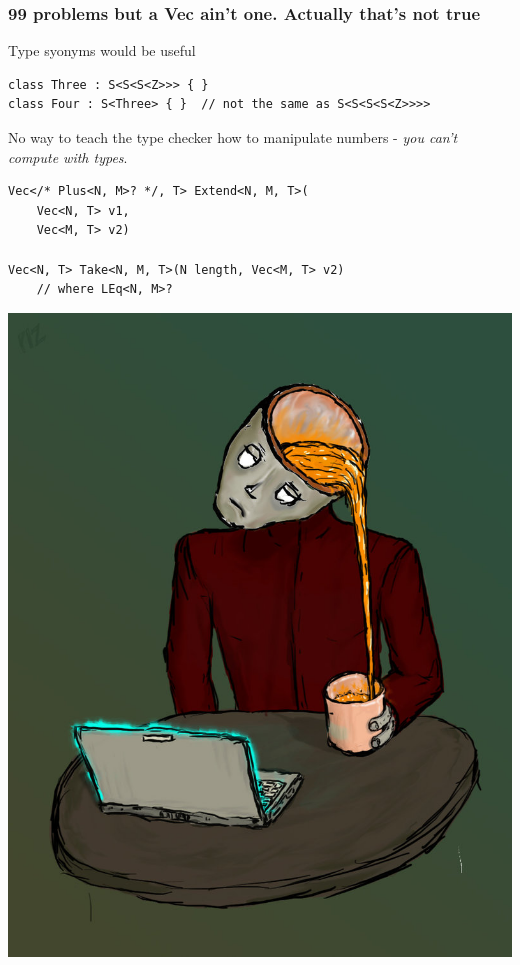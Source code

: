 \documentclass{beamer}
\begin{document}
  \begin{frame}[fragile]
    \frametitle{99 problems but a Vec ain't one. Actually that's not true}
    Type syonyms would be useful
    \begin{verbatim}
class Three : S<S<S<Z>>> { }
class Four : S<Three> { }  // not the same as S<S<S<S<Z>>>>
    \end{verbatim}
    
    No way to teach the type checker how to manipulate numbers - \emph{you can't compute with types}.
    \begin{verbatim}
Vec</* Plus<N, M>? */, T> Extend<N, M, T>(
    Vec<N, T> v1,
    Vec<M, T> v2)

Vec<N, T> Take<N, M, T>(N length, Vec<M, T> v2)
    // where LEq<N, M>?
    \end{verbatim}
\end{frame}

  \begin{frame}
    \centering
    \includegraphics[scale=0.3]{brain_melt_1.jpg}
  \end{frame}
\end{document}
